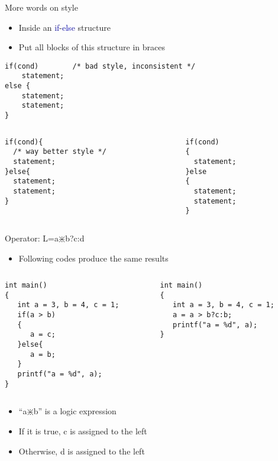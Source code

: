\begin{frame}[fragile]{More words on style}
	\begin{itemize}
		\item {Inside an \textcolor{blue}{if}-\textcolor{blue}{else} structure}
		\item {Put all blocks of this structure in braces}
	\end{itemize}
\begin{lstlisting}[numbers=none]
if(cond)		/* bad style, inconsistent */
    statement;
else {
    statement;
    statement;
}
\end{lstlisting}
\vspace{-0.3in}
\begin{columns}
\begin{column}{0.45\linewidth}
\begin{lstlisting}[numbers=none]
if(cond){  
  /* way better style */
  statement;
}else{
  statement;
  statement;
}
\end{lstlisting}
\end{column}
\begin{column}{0.45\linewidth}
\begin{lstlisting}[numbers=none]
if(cond)
{
  statement;
}else
{
  statement;
  statement;
}
\end{lstlisting}
\end{column}
\end{columns}
\end{frame}


\begin{frame}[fragile]{Operator: L=a$\divideontimes$b?c:d}
\begin{itemize}
	\item {Following codes produce the same results}
\end{itemize}
\vspace{-0.15in}
\begin{columns}
\begin{column}{0.48\linewidth}
\begin{lstlisting}[xleftmargin=0.05\linewidth]
int main()
{  
   int a = 3, b = 4, c = 1;
   if(a > b)
   {
      a = c;
   }else{
      a = b;
   }
   printf("a = %d", a);
}
\end{lstlisting}
\end{column}
\begin{column}{0.48\linewidth}
\begin{lstlisting}[xleftmargin=0.05\linewidth]
int main()
{  
   int a = 3, b = 4, c = 1;
   a = a > b?c:b;
   printf("a = %d", a);
}
\end{lstlisting}
\end{column}
\end{columns}
\vspace{-0.1in}
\begin{itemize}
	\item {``a$\divideontimes$b'' is a logic expression}
	\item {If it is true, c is assigned to the left}
	\item {Otherwise, d is assigned to the left}
\end{itemize}
\end{frame}

